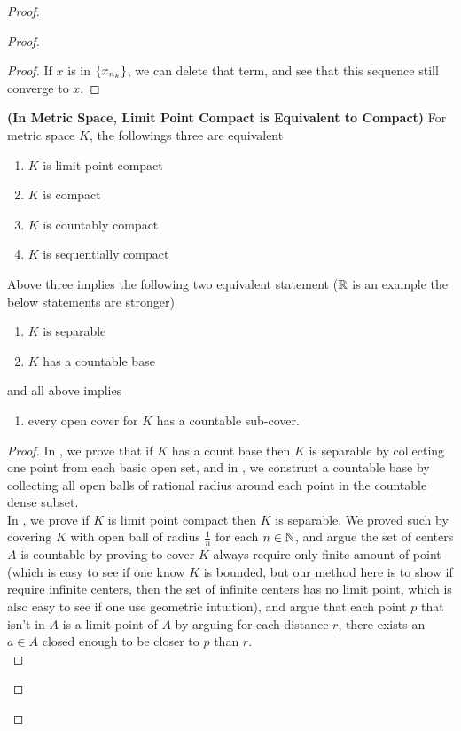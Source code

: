 \documentclass{report}
\begin{document}
\begin{proof}
\begin{proof}
\begin{proof}
If $x$ is in $\{ x_{n_k} \}$, we can delete that term, and see that this sequence still converge to $x$.
\end{proof}
\begin{theorem}
\label{3.5.7}
\textbf{(In Metric Space, Limit Point Compact is Equivalent to Compact)} For metric space $K$, the followings three are equivalent
\begin{enumerate}[label=(\alph*)]
  \item $K$ is limit point compact 
  \item $K$ is compact 
  \item $K$ is countably compact 
  \item $K$ is sequentially compact
\end{enumerate}
Above three implies the following two equivalent statement ($\mathbb{R}$ is an example the below statements are stronger)
\begin{enumerate}[label=(\arabic*)]
  \item $K$ is separable
  \item $K$ has a countable base
\end{enumerate}
and all above implies
\begin{enumerate}[label=(\roman*)]
  \item every open cover for $K$ has a countable sub-cover.
\end{enumerate}
\end{theorem}
\begin{proof}
In , we prove that if $K$ has a count base then $K$ is separable by collecting one point from each basic open set, and in , we construct a countable base by collecting all open balls of rational radius around each point in the countable dense subset.\\

In , we prove if $K$ is limit point compact then  $K$ is separable. We proved such by covering $K$ with open ball of radius $\frac{1}{n}$ for each $n\in\mathbb{N}$, and argue the set of centers $A$ is countable by proving to cover $K$ always require only finite amount of point (which is easy to see if one know $K$ is bounded, but our method here is to show if require infinite centers, then the set of infinite centers has no limit point, which is also easy to see if one use geometric intuition), and argue that each point $p$ that isn't in $A$ is a limit point of $A$ by arguing for each distance $r$, there exists an  $a\in A$ closed enough to be closer to $p$ than $r$.\\


\end{proof}
\end{proof}
\end{proof}
\end{document}
